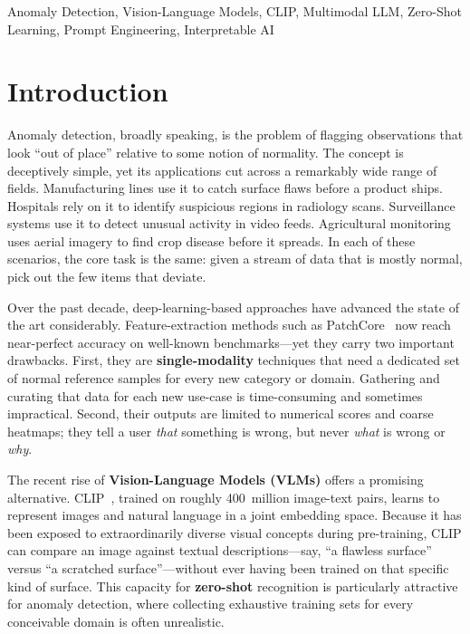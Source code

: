 \documentclass[conference]{IEEEtran}
\begin{document}
\begin{IEEEkeywords}
Anomaly Detection, Vision-Language Models, CLIP, Multimodal LLM, Zero-Shot Learning, Prompt Engineering, Interpretable AI
\end{IEEEkeywords}

\section{Introduction}

Anomaly detection, broadly speaking, is the problem of flagging observations that look ``out of place'' relative to some notion of normality. The concept is deceptively simple, yet its applications cut across a remarkably wide range of fields. Manufacturing lines use it to catch surface flaws before a product ships. Hospitals rely on it to identify suspicious regions in radiology scans. Surveillance systems use it to detect unusual activity in video feeds. Agricultural monitoring uses aerial imagery to find crop disease before it spreads. In each of these scenarios, the core task is the same: given a stream of data that is mostly normal, pick out the few items that deviate.

Over the past decade, deep-learning-based approaches have advanced the state of the art considerably. Feature-extraction methods such as PatchCore~\cite{roth2022patchcore} now reach near-perfect accuracy on well-known benchmarks---yet they carry two important drawbacks. First, they are \textbf{single-modality} techniques that need a dedicated set of normal reference samples for every new category or domain. Gathering and curating that data for each new use-case is time-consuming and sometimes impractical. Second, their outputs are limited to numerical scores and coarse heatmaps; they tell a user \textit{that} something is wrong, but never \textit{what} is wrong or \textit{why}.

The recent rise of \textbf{Vision-Language Models (VLMs)} offers a promising alternative. CLIP~\cite{radford2021clip}, trained on roughly 400~million image-text pairs, learns to represent images and natural language in a joint embedding space. Because it has been exposed to extraordinarily diverse visual concepts during pre-training, CLIP can compare an image against textual descriptions---say, ``a flawless surface'' versus ``a scratched surface''---without ever having been trained on that specific kind of surface. This capacity for \textbf{zero-shot} recognition is particularly attractive for anomaly detection, where collecting exhaustive training sets for every conceivable domain is often unrealistic.
\end{document}

